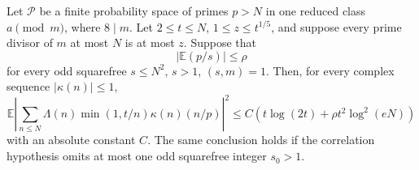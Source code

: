 \begin{lemma}\label{qs-second-moment}
Let $\mathcal P$ be a finite probability space of primes $p>N$
in one reduced class $a\pmod m$, where $8\mid m$.
Let $2\le t\le N$, $1\le z\le t^{1/5}$, and suppose every prime
divisor of $m$ at most $N$ is at most $z$. Suppose that
\[
 |\mathbb E(p/s)|\le\rho
\]
for every odd squarefree $s\le N^2$, $s>1$, $(s,m)=1$.
Then, for every complex sequence $|\kappa(n)|\le1$,
\begin{equation}\label{qs-moment}
 \mathbb E\left|\sum_{n\le N}\Lambda(n)\min(1,t/n)
                         \kappa(n)(n/p)\right|^2
 \le C\left(t\log(2t)+\rho t^2\log^2(eN)\right)
\end{equation}
with an absolute constant $C$.
The same conclusion holds if the correlation hypothesis omits
at most one odd squarefree integer $s_0>1$.
\end{lemma}
